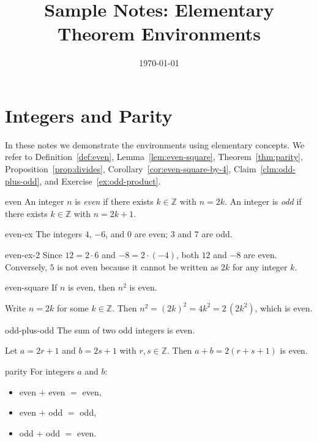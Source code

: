 \documentclass[11pt,a4paper]{article}
\title{Sample Notes: Elementary Theorem Environments}
\author{}
\date{\today}
\begin{document}
\maketitle

\section{Integers and Parity}

In these notes we demonstrate the environments using elementary concepts. We refer to Definition~\ref{def:even}, Lemma~\ref{lem:even-square}, Theorem~\ref{thm:parity}, Proposition~\ref{prop:divides}, Corollary~\ref{cor:even-square-by-4}, Claim~\ref{clm:odd-plus-odd}, and Exercise~\ref{ex:odd-product}.

\begin{definition}{}{even}
An integer $n$ is \emph{even} if there exists $k\in \mathbb{Z}$ with $n=2k$. An integer is \emph{odd} if there exists $k\in\mathbb{Z}$ with $n=2k+1$.
\end{definition}

\begin{example}{}{even-ex}
The integers $4$, $-6$, and $0$ are even; $3$ and $7$ are odd.
\end{example}

\begin{example}{}{even-ex-2}
Since $12=2\cdot6$ and $-8=2\cdot(-4)$, both $12$ and $-8$ are even. Conversely, $5$ is not even because it cannot be written as $2k$ for any integer $k$.
\end{example}

\begin{lemma}{}{even-square}
If $n$ is even, then $n^2$ is even.
\end{lemma}
	
\begin{proofbox}{}{}
Write $n=2k$ for some $k\in\mathbb{Z}$. Then $n^2=(2k)^2=4k^2=2\,(2k^2)$, which is even.
\end{proofbox}

\begin{claim}{}{odd-plus-odd}
The sum of two odd integers is even.
\end{claim}

\begin{proofbox}{}{}
Let $a=2r+1$ and $b=2s+1$ with $r,s\in\mathbb{Z}$. Then $a+b=2(r+s+1)$ is even.
\end{proofbox}

\begin{theorem}{}{parity}
For integers $a$ and $b$:
\begin{itemize}
  \item even $+$ even $=$ even,
  \item even $+$ odd $=$ odd,
  \item odd $+$ odd $=$ even.
\end{itemize}
\end{theorem}
\end{document}
